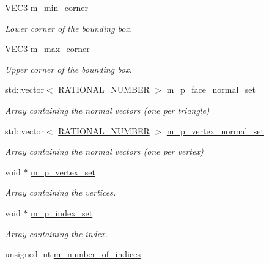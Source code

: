 \begin{DoxyCompactItemize}
\hyperlink{class_math_1_1_vec3}{VEC3} \hyperlink{class_graphics_1_1_polygon_mesh_a15afbd27c9bc4138d6b820a410401d16}{m\_\-min\_\-corner}
\begin{DoxyCompactList}\small\item\em Lower corner of the bounding box. \end{DoxyCompactList}\item 
\hyperlink{class_math_1_1_vec3}{VEC3} \hyperlink{class_graphics_1_1_polygon_mesh_a0a315335b8e97b4a533308365817660d}{m\_\-max\_\-corner}
\begin{DoxyCompactList}\small\item\em Upper corner of the bounding box. \end{DoxyCompactList}\item 
std::vector$<$ \hyperlink{namespace_utilities_a40969b96bd8d847b962e297cb79f08ce}{RATIONAL\_\-NUMBER} $>$ \hyperlink{class_graphics_1_1_polygon_mesh_a737a511ebb529e1abbb58301c9889247}{m\_\-p\_\-face\_\-normal\_\-set}
\begin{DoxyCompactList}\small\item\em Array containing the normal vectors (one per triangle) \end{DoxyCompactList}\item 
std::vector$<$ \hyperlink{namespace_utilities_a40969b96bd8d847b962e297cb79f08ce}{RATIONAL\_\-NUMBER} $>$ \hyperlink{class_graphics_1_1_polygon_mesh_aab6df25fff511d684579ca76d026fcf2}{m\_\-p\_\-vertex\_\-normal\_\-set}
\begin{DoxyCompactList}\small\item\em Array containing the normal vectors (one per vertex) \end{DoxyCompactList}\item 
void $\ast$ \hyperlink{class_graphics_1_1_polygon_mesh_ae577b2b3640a376042681a02008c6e39}{m\_\-p\_\-vertex\_\-set}
\begin{DoxyCompactList}\small\item\em Array containing the vertices. \end{DoxyCompactList}\item 
void $\ast$ \hyperlink{class_graphics_1_1_polygon_mesh_a0065f5a4a8e996c1b6da44778e978953}{m\_\-p\_\-index\_\-set}
\begin{DoxyCompactList}\small\item\em Array containing the index. \end{DoxyCompactList}\item 
unsigned int \hyperlink{class_graphics_1_1_polygon_mesh_a15c785b7d751c4876cd46c6788d411da}{m\_\-number\_\-of\_\-indices}

\end{DoxyCompactItemize}

